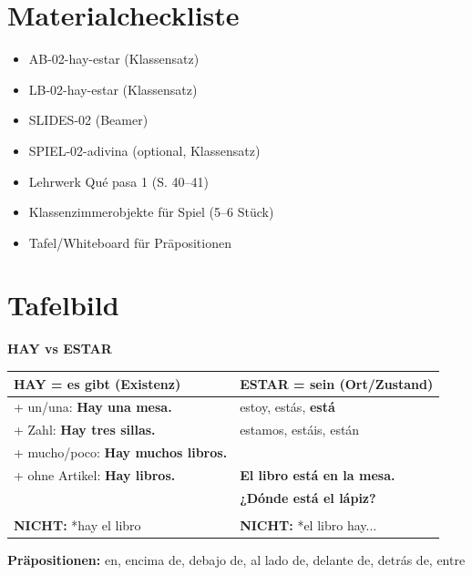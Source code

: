 \documentclass[11pt,a4paper]{article}
\newcommand{\es}[1]{\textbf{#1}}
\begin{document}
\section*{Materialcheckliste}

\begin{itemize}[nosep]
    \item[$\square$] AB-02-hay-estar (Klassensatz)
    \item[$\square$] LB-02-hay-estar (Klassensatz)
    \item[$\square$] SLIDES-02 (Beamer)
    \item[$\square$] SPIEL-02-adivina (optional, Klassensatz)
    \item[$\square$] Lehrwerk Qué pasa 1 (S. 40--41)
    \item[$\square$] Klassenzimmerobjekte für Spiel (5--6 Stück)
    \item[$\square$] Tafel/Whiteboard für Präpositionen
\end{itemize}

\vspace{0.5cm}

\section*{Tafelbild}

\begin{tcolorbox}[colback=white, colframe=grau]
\textbf{HAY vs ESTAR}

\vspace{0.3cm}
\begin{tabular}{p{6.5cm}|p{6.5cm}}
\textbf{HAY = es gibt (Existenz)} & \textbf{ESTAR = sein (Ort/Zustand)} \\
\hline
+ un/una: \es{Hay una mesa.} & estoy, estás, \textbf{está} \\
+ Zahl: \es{Hay tres sillas.} & estamos, estáis, están \\
+ mucho/poco: \es{Hay muchos libros.} & \\
+ ohne Artikel: \es{Hay libros.} & \es{El libro está en la mesa.} \\
& \es{¿Dónde está el lápiz?} \\
\hline
\multicolumn{2}{c}{} \\
\textbf{NICHT:} *hay el libro & \textbf{NICHT:} *el libro hay... \\
\end{tabular}

\vspace{0.3cm}

\textbf{Präpositionen:} en, encima de, debajo de, al lado de, delante de, detrás de, entre
\end{tcolorbox}
\end{document}
